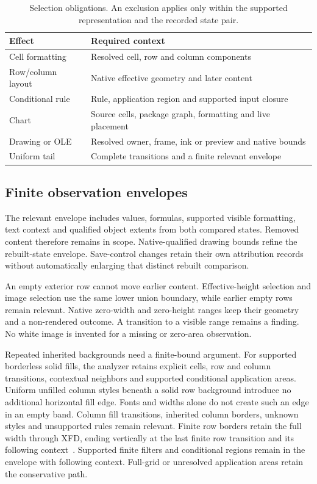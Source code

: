 \begin{table}[t]
\caption{Selection obligations. An exclusion applies only within the supported
representation and the recorded state pair.}
\label{tab:selection-obligations}
\centering\footnotesize
\begin{tabular}{p{}p{}}
\hline
Effect & Required context \\
\hline
Cell formatting & Resolved cell, row and column components \\
Row/column layout & Native effective geometry and later content \\
Conditional rule & Rule, application region and supported input closure \\
Chart & Source cells, package graph, formatting and live placement \\
Drawing or OLE & Resolved owner, frame, ink or preview and native bounds \\
Uniform tail & Complete transitions and a finite relevant envelope \\
\hline
\end{tabular}
\end{table}

\subsection{Finite observation envelopes}
The relevant envelope includes values, formulas, supported visible formatting,
text context and qualified object extents from both compared states. Removed
content therefore remains in scope. Native-qualified drawing bounds refine the
rebuilt-state envelope. Save-control changes retain their own attribution records
without automatically enlarging that distinct rebuilt comparison.

An empty exterior row cannot move earlier content. Effective-height selection
and image selection use the same lower union boundary, while earlier empty rows
remain relevant. Native zero-width and zero-height ranges keep their geometry
and a non-rendered outcome. A transition to a visible range remains a finding.
No white image is invented for a missing or zero-area observation.

Repeated inherited backgrounds need a finite-bound argument. For supported
borderless solid fills, the analyzer retains explicit cells, row and column
transitions, contextual neighbors and supported conditional application areas.
Uniform unfilled column styles beneath a solid row background introduce no
additional horizontal fill edge. Fonts and widths alone do not create such an
edge in an empty band. Column fill transitions, inherited column borders,
unknown styles and unsupported rules remain relevant. Finite row borders retain
the full width through XFD, ending vertically at the last finite row transition
and its following context~\cite{rowborderbackground}. Supported finite filters and
conditional regions remain in the envelope with following context. Full-grid
or unresolved application areas retain the conservative path.

